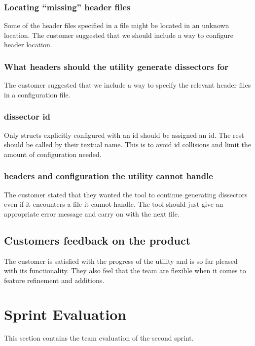 \subsubsection{Locating “missing” \gls{header} files}
Some of the \gls{header} files specified in a file might be located in an unknown location. The customer suggested that we should include a way to configure \gls{header} location.

\subsubsection{What \glspl{header} should the \gls{utility} generate \glspl{dissector} for}
The customer suggested that we include a way to specify the relevant \gls{header} files in a configuration file.

\subsubsection{\Gls{dissector} id}
Only \glspl{struct} explicitly configured with an id should be assigned an id. The rest should be called by their textual name. This is to avoid id collisions and limit the amount of configuration needed.

\subsubsection{\Glspl{header} and configuration the \gls{utility} cannot handle}
The customer stated that they wanted the tool to continue generating \glspl{dissector} even if it encounters a file it cannot handle. The tool should just give an appropriate error message and carry on with the next file.

\subsection{Customers feedback on the product}
The customer is satisfied with the progress of the \gls{utility} and is so far pleased with its functionality. They also feel that the team are flexible when it comes to feature refinement and additions. 

\section{Sprint Evaluation}
\label{sec:sp2:eval}
This section contains the team evaluation of the second sprint.

